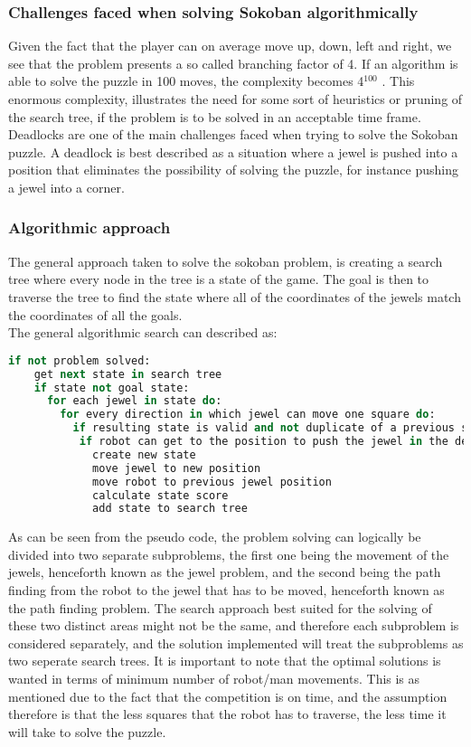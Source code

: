 \subsubsection{Challenges faced when solving Sokoban algorithmically}
Given the fact that the player can on average move up, down, left and right, we see that the problem presents a so called branching factor of 4. If an algorithm is able to solve the puzzle in 100 moves, the complexity becomes 4$^{100}$ . 
This enormous complexity, illustrates the need for some sort of heuristics or pruning of the search tree, if the problem is to be solved in an acceptable time frame.
Deadlocks are one of the main challenges faced when trying to solve the Sokoban puzzle. A deadlock is best described as a situation where a jewel is pushed into a position that eliminates the possibility of solving the puzzle, for instance pushing a jewel into a corner. 

\subsubsection{Algorithmic approach}
The general approach taken to solve the sokoban problem, is creating a search tree where every node in the tree is a state of the game. The goal is then to traverse the tree to find the state where all of the coordinates of the jewels match the coordinates of all the goals.\\
The general algorithmic search can described as:

\begin{lstlisting}[language=Ruby, frame=single, basicstyle=\tiny, caption={Deadlock detection pseudo code}, label={code:sokoalgo}]
if not problem solved:
	get next state in search tree
	if state not goal state:
	  for each jewel in state do:
	    for every direction in which jewel can move one square do:
		  if resulting state is valid and not duplicate of a previous state:
		   if robot can get to the position to push the jewel in the desired direction:
             create new state				
			 move jewel to new position
			 move robot to previous jewel position
			 calculate state score
			 add state to search tree	
\end{lstlisting}

As can be seen from the pseudo code, the problem solving can logically be divided into two separate subproblems, the first one being the movement of the jewels, henceforth known as the jewel problem, and the second being the path finding from the robot to the jewel that has to be moved, henceforth known as the path finding problem. 
The search approach best suited for the solving of these two distinct areas might not be the same, and therefore each subproblem is considered separately, and the solution implemented will treat the subproblems as two seperate search trees. 
It is important to note that the optimal solutions is wanted in terms of minimum number of robot/man movements. This is as mentioned due to the fact that the competition is on time, and the assumption therefore is that the less squares that the robot has to traverse, the less time it will take to solve the puzzle.